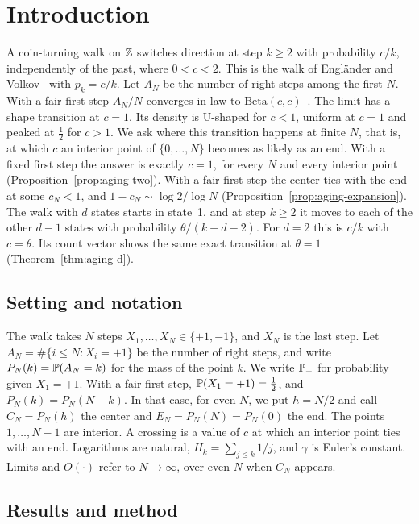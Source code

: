 \section{Introduction}\label{sec:intro}

A coin-turning walk on $\mathbb{Z}$ switches direction at step $k\ge2$ with
probability $c/k$, independently of the past, where $0<c<2$. This is the walk
of Engl\"ander and Volkov~\cite{ev2018,evw2020} with $p_k=c/k$. Let $A_N$ be
the number of right steps among the first $N$. With a fair first step
$A_N/N$ converges in law to $\mathrm{Beta}(c,c)$~\cite{ds2007,ev2018}. The
limit has a shape transition at $c=1$. Its density is U-shaped for $c<1$,
uniform at $c=1$ and peaked at $\frac12$ for $c>1$. We ask where this
transition happens at finite $N$, that is, at which $c$ an interior point of
$\{0,\dots,N\}$ becomes as likely as an end. With a fixed first step the
answer is exactly $c=1$, for every $N$ and every interior point
(Proposition~\ref{prop:aging-two}). With a fair first step the center ties
with the end at some $c_N<1$, and $1-c_N\sim\log2/\log N$
(Proposition~\ref{prop:aging-expansion}). The walk with $d$ states starts in
state~1, and at step $k\ge2$ it moves to each of the other $d-1$ states with
probability $\theta/(k+d-2)$. For $d=2$ this is $c/k$ with $c=\theta$. Its
count vector shows the same exact transition at $\theta=1$
(Theorem~\ref{thm:aging-d}).

\subsection{Setting and notation}\label{sec:notation}

The walk takes $N$ steps $X_1,\dots,X_N\in\{+1,-1\}$, and $X_N$ is the last
step. Let $A_N=\#\{i\le N:X_i=+1\}$ be the number of right steps, and write
$P_N(k)=\mathbb{P}(A_N=k)$ for the mass of the point $k$. We write $\mathbb{P}_+$ for
probability given $X_1=+1$. With a fair first step, $\mathbb{P}(X_1=+1)=\frac12$,
and $P_N(k)=P_N(N-k)$. In that case, for even $N$, we put $h=N/2$ and call $C_N=P_N(h)$
the center and $E_N=P_N(N)=P_N(0)$ the end. The points $1,\dots,N-1$ are interior. A crossing is a value of $c$ at
which an interior point ties with an end. Logarithms are natural, $H_k=\sum_{j\le k}1/j$,
and $\gamma$ is Euler's constant. Limits and $O(\cdot)$ refer to
$N\to\infty$, over even $N$ when $C_N$ appears.

\subsection{Results and method}\label{sec:results}

